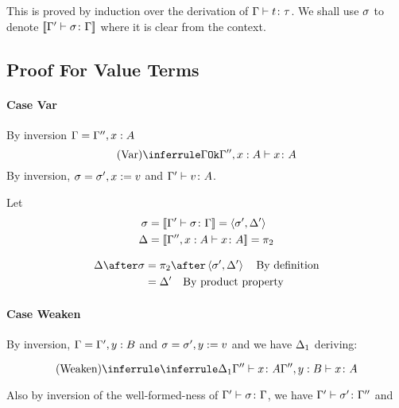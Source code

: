 {    %
    This is proved by induction over the derivation of $\Gamma \vdash t \colon \tau$.
    We shall use $\sigma$ to denote ${\bf [\![}\Gamma' \vdash \sigma \colon \Gamma{\bf ]\!]}$ where it is clear from the context.
    \subsection{Proof For Value Terms}
    \paragraph{Case Var}
    By inversion $\Gamma = \Gamma'', x:A$
    \begin{equation}
        \ntreeruleI{Var}{\ok{\G}}{\typerelation{\G'', x:A}{x}{A}}
    \end{equation}
    By inversion, $\sigma = \sigma', x:= v$ and $\Gamma' \vdash v \colon A$.

    Let 
    \begin{align}
        \sigma &={\bf [\![}\Gamma' \vdash \sigma \colon \Gamma{\bf ]\!]} = \left\langle\sigma', \Delta'\right\rangle\\
        \Delta &={\bf [\![}\Gamma'', x:A \vdash x \colon A{\bf ]\!]} = \pi_2\\
    \end{align}

    \begin{align}
        \D\after\si &= \pp\after\pr{\si'}{\D'}\qt{By definition}\\
        &= \D'\qt{By product property}
    \end{align}
    \paragraph{Case Weaken}
    By inversion, $\Gamma = \Gamma', y:B$ and $\sigma = \sigma', y:= v$
    and we have $\Delta_1$ deriving:

    \begin{equation}
        \ntreeruleI{Weaken}{\treeruleI{\D_1}{\typerelation{\G''}{x}{A}}}{\typerelation{\G'',y: B}{x}{A}}
    \end{equation}

    Also by inversion of the well-formed-ness of $\Gamma' \vdash \sigma \colon \Gamma$, we have $\Gamma' \vdash \sigma' \colon \Gamma''$ and 
    
}
